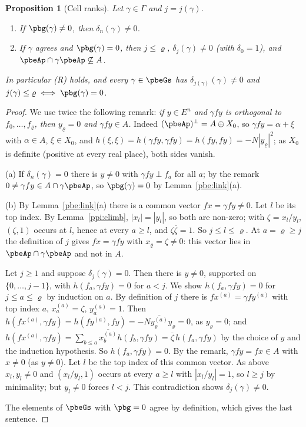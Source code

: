 \documentclass[10pt]{amsart}
\newtheorem{proposition}[theorem]{Proposition}
\theoremstyle{definition}
\theoremstyle{remark}
\providecommand{\aubar}[1]{\overline{#1}}
\begin{document}
\begin{proposition}[Cell ranks]\label{ppi:cell}
Let $\gamma\in\Gamma$ and $j=j(\gamma)$.
\begin{enumerate}
\item[(a)] If $\pbg(\gamma)\ne0$, then $\delta_n(\gamma)\ne0$.
\item[(b)] If $\gamma$ agrees and $\pbg(\gamma)=0$, then $j\le\varrho$, $\delta_j(\gamma)\ne0$ (with
$\delta_0=1$), and $\pbeAp\cap\gamma\pbeAp\not\subseteq A$.
\end{enumerate}
In particular \textup{(R)} holds, and every $\gamma\in\pbeGs$ has $\delta_{j(\gamma)}(\gamma)\ne0$ and
$j(\gamma)\le\varrho\iff\pbg(\gamma)=0$.
\end{proposition}
\begin{proof}
We use twice the following remark: \emph{if $y\in E^n$ and $\gamma fy$ is orthogonal to $f_0,\dots,
f_\varrho$, then $y_\varrho=0$ and $\gamma fy\in A$.} Indeed $(\pbeAp)^\perp=A\oplus X_0$, so $\gamma fy=
\alpha+\xi$ with $\alpha\in A$, $\xi\in X_0$, and $h(\xi,\xi)=h(\gamma fy,\gamma fy)=h(fy,fy)=-N|y_\varrho
|^2$; as $X_0$ is definite (positive at every real place), both sides vanish.

(a) If $\delta_n(\gamma)=0$ there is $y\ne0$ with $\gamma fy\perp f_a$ for all $a$; by the remark
$0\ne\gamma fy\in A\cap\gamma\pbeAp$, so $\pbg(\gamma)=0$ by Lemma~\ref{pbe:link}(a).

(b) By Lemma~\ref{pbe:link}(a) there is a common vector $fx=\gamma fy\ne0$. Let $l$ be its top index.
By Lemma~\ref{ppi:climb}, $|x_l|=|y_l|$, so both are non-zero; with $\zeta=x_l/y_l$, $(\zeta,1)$
occurs at $l$, hence at every $a\ge l$, and $\zeta\aubar\zeta=1$. So $j\le l\le\varrho$. At $a=\varrho\ge
j$ the definition of $j$ gives $fx=\gamma fy$ with $x_\varrho=\zeta\ne0$: this vector lies in $\pbeAp\cap
\gamma\pbeAp$ and not in $A$.

Let $j\ge1$ and suppose $\delta_j(\gamma)=0$. Then there is $y\ne0$, supported on $\{0,\dots,j-1\}$,
with $h(f_a,\gamma fy)=0$ for $a<j$. We show $h(f_a,\gamma fy)=0$ for $j\le a\le\varrho$ by induction
on $a$. By definition of $j$ there is $fx^{(a)}=\gamma fy^{(a)}$ with top index $a$, $x^{(a)}_a=\zeta$,
$y^{(a)}_a=1$. Then $h(fx^{(a)},\gamma fy)=h(fy^{(a)},fy)=-N\aubar{y^{(a)}_\varrho}y_\varrho=0$, as
$y_\varrho=0$; and $h(fx^{(a)},\gamma fy)=\sum_{b\le a}\aubar{x^{(a)}_b}h(f_b,\gamma fy)=\aubar\zeta\,
h(f_a,\gamma fy)$ by the choice of $y$ and the induction hypothesis. So $h(f_a,\gamma fy)=0$. By the
remark, $\gamma fy=fx\in A$ with $x\ne0$ (as $y\ne0$). Let $l$ be the top index of this common vector.
As above $x_l,y_l\ne0$ and $(x_l/y_l,1)$ occurs at every $a\ge l$ with $|x_l/y_l|=1$, so $l\ge j$ by
minimality; but $y_l\ne0$ forces $l<j$. This contradiction shows $\delta_j(\gamma)\ne0$.

The elements of $\pbeGs$ with $\pbg=0$ agree by definition, which gives the last sentence.
\end{proof}
\end{document}
